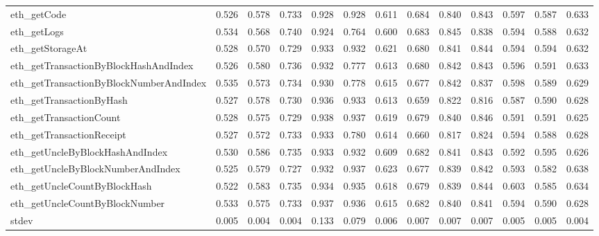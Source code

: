 \begin{tabular}{lrrrrrrrrrrrr}
eth\_getCode                                 &    0.526 &    0.578 &    0.733 &    0.928 &    0.928 &    0.611 &      0.684 &      0.840 &      0.843 &          0.597 &          0.587 &          0.633 \\
eth\_getLogs                                 &    0.534 &    0.568 &    0.740 &    0.924 &    0.764 &    0.600 &      0.683 &      0.845 &      0.838 &          0.594 &          0.588 &          0.632 \\
eth\_getStorageAt                            &    0.528 &    0.570 &    0.729 &    0.933 &    0.932 &    0.621 &      0.680 &      0.841 &      0.844 &          0.594 &          0.594 &          0.632 \\
eth\_getTransactionByBlockHashAndIndex       &    0.526 &    0.580 &    0.736 &    0.932 &    0.777 &    0.613 &      0.680 &      0.842 &      0.843 &          0.596 &          0.591 &          0.633 \\
eth\_getTransactionByBlockNumberAndIndex     &    0.535 &    0.573 &    0.734 &    0.930 &    0.778 &    0.615 &      0.677 &      0.842 &      0.837 &          0.598 &          0.589 &          0.629 \\
eth\_getTransactionByHash                    &    0.527 &    0.578 &    0.730 &    0.936 &    0.933 &    0.613 &      0.659 &      0.822 &      0.816 &          0.587 &          0.590 &          0.628 \\
eth\_getTransactionCount                     &    0.528 &    0.575 &    0.729 &    0.938 &    0.937 &    0.619 &      0.679 &      0.840 &      0.846 &          0.591 &          0.591 &          0.625 \\
eth\_getTransactionReceipt                   &    0.527 &    0.572 &    0.733 &    0.933 &    0.780 &    0.614 &      0.660 &      0.817 &      0.824 &          0.594 &          0.588 &          0.628 \\
eth\_getUncleByBlockHashAndIndex             &    0.530 &    0.586 &    0.735 &    0.933 &    0.932 &    0.609 &      0.682 &      0.841 &      0.843 &          0.592 &          0.595 &          0.626 \\
eth\_getUncleByBlockNumberAndIndex           &    0.525 &    0.579 &    0.727 &    0.932 &    0.937 &    0.623 &      0.677 &      0.839 &      0.842 &          0.593 &          0.582 &          0.638 \\
eth\_getUncleCountByBlockHash                &    0.522 &    0.583 &    0.735 &    0.934 &    0.935 &    0.618 &      0.679 &      0.839 &      0.844 &          0.603 &          0.585 &          0.634 \\
eth\_getUncleCountByBlockNumber              &    0.533 &    0.575 &    0.733 &    0.937 &    0.936 &    0.615 &      0.682 &      0.840 &      0.841 &          0.594 &          0.590 &          0.628 \\
\midrule
stdev &    0.005 &    0.004 &    0.004 &    0.133 &    0.079 &    0.006 &      0.007 &      0.007 &      0.007 &          0.005 &          0.005 &          0.004 \\
\bottomrule
\end{tabular}

